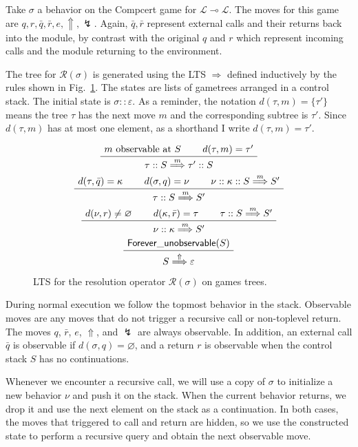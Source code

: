 \documentclass[11pt]{article}
\newcommand{\kw}[1]{{\mathsf{#1}}}
\begin{document}
Take $\sigma$ a behavior on the Compcert game for
$\mathcal{L} \multimap \mathcal{L}$.
The moves for this game are $q, r, \bar{q}, \bar{r}, e, \Uparrow, \lightning$.
Again, $\bar{q}, \bar{r}$ represent external calls and their returns
back into the module,
by contrast with the original $q$ and $r$ which represent
incoming calls and the module returning to the environment.

The tree for $\mathcal{R}(\sigma)$ is generated
using the LTS $\Rightarrow$ defined inductively
by the rules shown in Fig.~\ref{fig:res}.
The states are lists of gametrees arranged in a control stack.
The initial state is $\sigma :: \varepsilon$.
As a reminder,
the notation $d(\tau, m) = \{\tau'\}$ means
the tree $\tau$ has the next move $m$
and the corresponding subtree is $\tau'$.
Since $d(\tau, m)$ has at most one element,
as a shorthand I write $d(\tau, m) = \tau'$.

\begin{figure}
\[
  \AxiomC{$m \mbox{ observable at } S$}
  \AxiomC{$d(\tau, m) = \tau'$}
  \BinaryInfC{$\tau :: S \stackrel{m}{\Longrightarrow} \tau' :: S$}
  \DisplayProof
\]
\vspace{.5em}
\[
  \AxiomC{$d(\tau, \bar{q}) = \kappa$}
  \AxiomC{$d(\sigma, q) = \nu$}
  \AxiomC{$\nu :: \kappa :: S \stackrel{m}{\Longrightarrow} S'$}
  \TrinaryInfC{$\tau :: S \stackrel{m}{\Longrightarrow} S'$}
  \DisplayProof
\]
\vspace{.5em}
\[
  \AxiomC{$d(\nu, r) \ne \varnothing$}
  \AxiomC{$d(\kappa, \bar{r}) = \tau$}
  \AxiomC{$\tau :: S \stackrel{m}{\Longrightarrow} S'$}
  \TrinaryInfC{$\nu :: \kappa \stackrel{m}{\Longrightarrow} S'$}
  \DisplayProof
\]
\vspace{.5em}
\[
  \AxiomC{$\kw{Forever\_unobservable}(S)$}
  \UnaryInfC{$S \stackrel{\Uparrow}{\Longrightarrow} \varepsilon$}
  \DisplayProof
\]
\caption{LTS for the resolution operator
  $\mathcal{R}(\sigma)$ on games trees.}
\label{fig:res}
\end{figure}

During normal execution we follow the topmost behavior in the stack.
Observable moves are any moves that do not trigger a recursive call
or non-toplevel return.
The moves $q$, $\bar{r}$, $e$, $\Uparrow$, and $\lightning$
are always observable.
In addition,
an external call $\bar{q}$
is observable if $d(\sigma, q) = \varnothing$,
and a return $r$
is observable when the control stack $S$ has no continuations.

Whenever we encounter a recursive call,
we will use a copy of $\sigma$
to initialize a new behavior $\nu$ and push it on the stack.
When the current behavior returns,
we drop it and use the next element on the stack as a continuation.
In both cases,
the moves that triggered to call and return are hidden,
so we use the constructed state to perform a recursive query
and obtain the next observable move.
\end{document}
